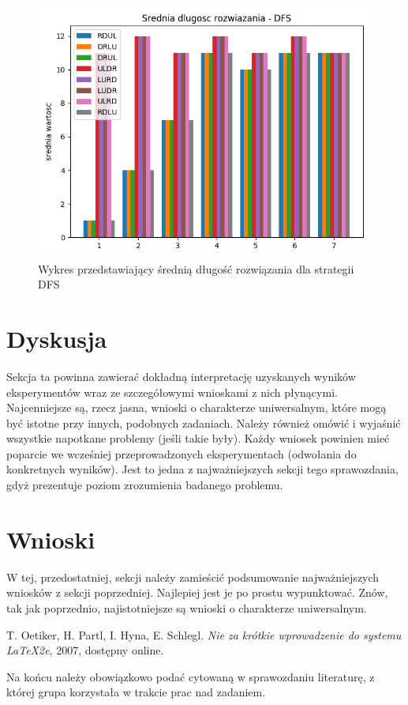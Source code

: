 \documentclass{classrep}
\begin{document}
{\begin{figure}
\includegraphics [scale=0.5]{dlugosc_DFS}
\caption{Wykres przedstawiający średnią długość rozwiązania dla strategii DFS}
\end{figure}
}
\newpage
\section{Dyskusja}
{\color{blue}
Sekcja ta powinna zawierać dokładną interpretację uzyskanych wyników
eksperymentów wraz ze szczegółowymi wnioskami z nich płynącymi. Najcenniejsze
są, rzecz jasna, wnioski o charakterze uniwersalnym, które mogą być istotne
przy innych, podobnych zadaniach. Należy również omówić i wyjaśnić wszystkie
napotkane problemy (jeśli takie były). Każdy wniosek powinien mieć poparcie we
wcześniej przeprowadzonych eksperymentach (odwołania do konkretnych wyników).
Jest to jedna z najważniejszych sekcji tego sprawozdania, gdyż prezentuje
poziom zrozumienia badanego problemu.}

\section{Wnioski}
{\color{blue}
W tej, przedostatniej, sekcji należy zamieścić podsumowanie najważniejszych
wniosków z sekcji poprzedniej. Najlepiej jest je po prostu wypunktować. Znów,
tak jak poprzednio, najistotniejsze są wnioski o charakterze uniwersalnym.}

\begin{thebibliography}{0}
   T. Oetiker, H. Partl, I. Hyna, E. Schlegl.
    \textsl{Nie za krótkie wprowadzenie do systemu \LaTeX2e}, 2007, dostępny
    online.
\end{thebibliography}

{\color{blue}
Na końcu należy obowiązkowo podać cytowaną w sprawozdaniu literaturę, z której
grupa korzystała w trakcie prac nad zadaniem.}
\end{document}
